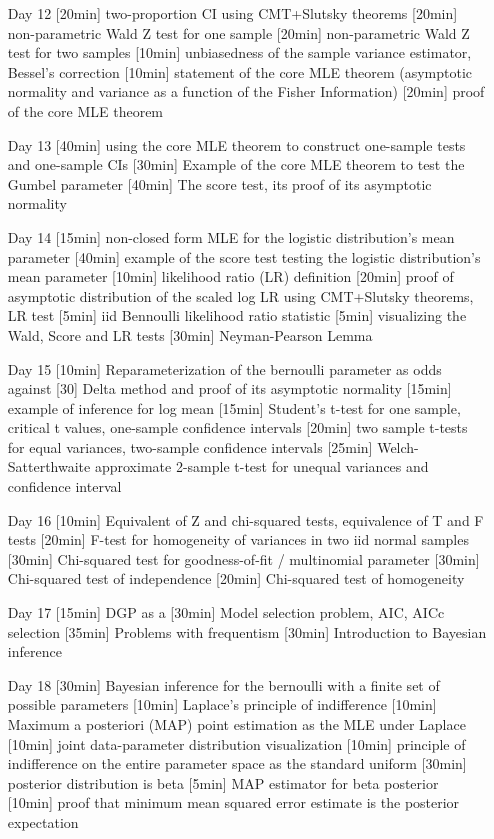 \begin{enumerate}
\item[Day 12] [20min] two-proportion CI using CMT+Slutsky theorems [20min] non-parametric Wald Z test for one sample [20min] non-parametric Wald Z test for two samples [10min] unbiasedness of the sample variance estimator, Bessel's correction [10min] statement of the core MLE theorem (asymptotic normality and variance as a function of the Fisher Information) [20min] proof of the core MLE theorem

\item[Day 13] [40min] using the core MLE theorem to construct one-sample tests and one-sample CIs [30min] Example of the core MLE theorem to test the Gumbel parameter [40min] The score test, its proof of its asymptotic normality 

\item[Day 14] [15min] non-closed form MLE for the logistic distribution's mean parameter [40min] example of the score test testing the logistic distribution's mean parameter [10min] likelihood ratio (LR) definition [20min] proof of asymptotic distribution of the scaled log LR using CMT+Slutsky theorems, LR test [5min] iid Bennoulli likelihood ratio statistic [5min] visualizing the Wald, Score and LR tests [30min] Neyman-Pearson Lemma

\item[Day 15] [10min] Reparameterization of the bernoulli parameter as odds against [30] Delta method and proof of its asymptotic normality [15min] example of inference for log mean [15min] Student's t-test for one sample, critical t values, one-sample confidence intervals [20min] two sample t-tests for equal variances, two-sample confidence intervals [25min] Welch-Satterthwaite approximate 2-sample t-test for unequal variances and confidence interval

\item[Day 16] [10min] Equivalent of Z and chi-squared tests, equivalence of T and F tests [20min] F-test for homogeneity of variances in two iid normal samples [30min] Chi-squared test for goodness-of-fit / multinomial parameter [30min] Chi-squared test of independence [20min] Chi-squared test of homogeneity

\item[Day 17] [15min] DGP as a  [30min] Model selection problem, AIC, AICc selection [35min] Problems with frequentism [30min] Introduction to Bayesian inference

\item[Day 18] [30min] Bayesian inference for the bernoulli with a finite set of possible parameters [10min] Laplace's principle of indifference [10min] Maximum a posteriori (MAP) point estimation as the MLE under Laplace [10min] joint data-parameter distribution visualization [10min] principle of indifference on the entire parameter space as the standard uniform [30min] posterior distribution is beta [5min] MAP estimator for beta posterior [10min] proof that minimum mean squared error estimate is the posterior expectation



\end{enumerate}
